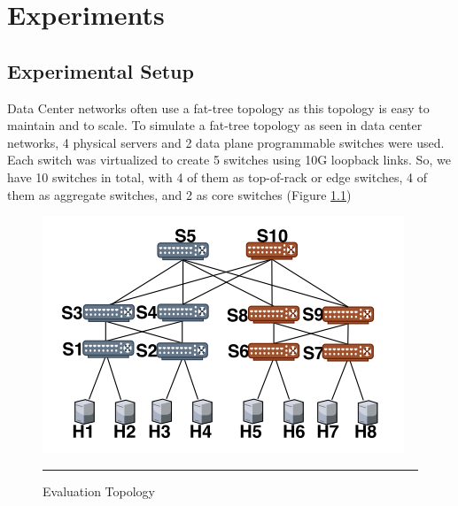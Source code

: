 
\chapter{Experiments} %

\label{Chapter3} %



\section{Experimental Setup}

Data Center networks often use a fat-tree topology as this topology is easy to maintain
and to scale. To simulate a fat-tree topology as seen in data center networks, 4 physical servers and 2 data plane programmable switches were used. Each switch
was virtualized to create 5 switches using 10G loopback links. So, we have 10 switches in total, with 4 of them as top-of-rack or edge switches,
4 of them as aggregate switches, and 2 as core switches (Figure \ref{fig:Topology})

\begin{figure}[htbp]
	\centering
		\includegraphics{Figures/Topology.png}
		\rule{35em}{0.5pt}
	\caption[Evaluation Topology]{Evaluation Topology}
	\label{fig:Topology}
\end{figure}

